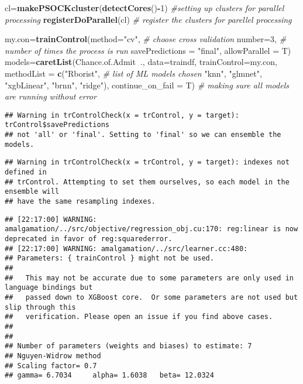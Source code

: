 \documentclass[11pt,]{article}
\newenvironment{Shaded}{\begin{snugshade}}{\end{snugshade}}
\newcommand{\CommentTok}[1]{\textcolor[rgb]{0.56,0.35,0.01}{\textit{#1}}}
\newcommand{\DataTypeTok}[1]{\textcolor[rgb]{0.13,0.29,0.53}{#1}}
\newcommand{\DecValTok}[1]{\textcolor[rgb]{0.00,0.00,0.81}{#1}}
\newcommand{\KeywordTok}[1]{\textcolor[rgb]{0.13,0.29,0.53}{\textbf{#1}}}
\newcommand{\NormalTok}[1]{#1}
\newcommand{\OperatorTok}[1]{\textcolor[rgb]{0.81,0.36,0.00}{\textbf{#1}}}
\newcommand{\StringTok}[1]{\textcolor[rgb]{0.31,0.60,0.02}{#1}}
\begin{document}
\begin{Shaded}
\begin{Highlighting}[]
\NormalTok{cl=}\KeywordTok{makePSOCKcluster}\NormalTok{(}\KeywordTok{detectCores}\NormalTok{()}\OperatorTok{-}\DecValTok{1}\NormalTok{) }\CommentTok{#setting up clusters for parallel processing}
\KeywordTok{registerDoParallel}\NormalTok{(cl) }\CommentTok{# register the clusters for parellel processing}

\NormalTok{my.con=}\KeywordTok{trainControl}\NormalTok{(}\DataTypeTok{method=}\StringTok{"cv"}\NormalTok{, }\CommentTok{# choose cross validation}
                    \DataTypeTok{number=}\DecValTok{3}\NormalTok{, }\CommentTok{# number of times the process is run}
                    \DataTypeTok{savePredictions =} \StringTok{"final"}\NormalTok{, }\DataTypeTok{allowParallel =}\NormalTok{ T)}
\NormalTok{models=}\KeywordTok{caretList}\NormalTok{(Chance.of.Admit}\OperatorTok{~}\NormalTok{., }\DataTypeTok{data=}\NormalTok{traindf,}
\DataTypeTok{trainControl=}\NormalTok{my.con, }
\DataTypeTok{methodList =} \KeywordTok{c}\NormalTok{(}\StringTok{"Rborist"}\NormalTok{,  }\CommentTok{# list of ML models chosen}
               \StringTok{"knn"}\NormalTok{, }
               \StringTok{"glmnet"}\NormalTok{,}
               \StringTok{"xgbLinear"}\NormalTok{,}
               \StringTok{"brnn"}\NormalTok{, }
               \StringTok{"ridge"}\NormalTok{), }
\DataTypeTok{continue_on_fail =}\NormalTok{ T) }\CommentTok{# making sure all models are running without error}
\end{Highlighting}
\end{Shaded}

\begin{verbatim}
## Warning in trControlCheck(x = trControl, y = target): trControl$savePredictions
## not 'all' or 'final'. Setting to 'final' so we can ensemble the models.
\end{verbatim}

\begin{verbatim}
## Warning in trControlCheck(x = trControl, y = target): indexes not defined in
## trControl. Attempting to set them ourselves, so each model in the ensemble will
## have the same resampling indexes.
\end{verbatim}

\begin{verbatim}
## [22:17:00] WARNING: amalgamation/../src/objective/regression_obj.cu:170: reg:linear is now deprecated in favor of reg:squarederror.
## [22:17:00] WARNING: amalgamation/../src/learner.cc:480: 
## Parameters: { trainControl } might not be used.
## 
##   This may not be accurate due to some parameters are only used in language bindings but
##   passed down to XGBoost core.  Or some parameters are not used but slip through this
##   verification. Please open an issue if you find above cases.
## 
## 
## Number of parameters (weights and biases) to estimate: 7 
## Nguyen-Widrow method
## Scaling factor= 0.7 
## gamma= 6.7034     alpha= 1.6038   beta= 12.0324
\end{verbatim}
\end{document}
